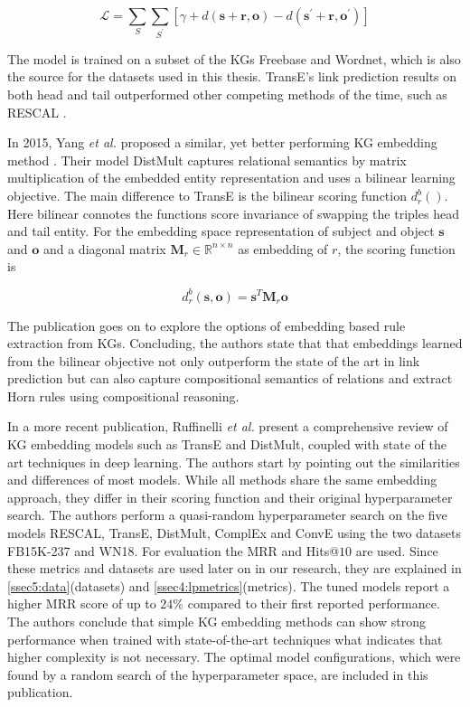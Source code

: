 \begin{equation}
    \mathcal{L}=\sum_{S} \sum_{S^{\prime}} \left[\gamma+d(\boldsymbol{s}+\boldsymbol{r}, \boldsymbol{o})-d\left(\boldsymbol{s}^{\prime}+\boldsymbol{r}, \boldsymbol{o}^{\prime}\right)\right]
\end{equation}

The model is trained on a subset of the KGs Freebase and Wordnet, which is also the source for the datasets used in this thesis. TransE's link prediction results on both head and tail outperformed other competing methods of the time, such as RESCAL \cite{nickel_three-way_nodate}.

In 2015, Yang \textit{et al.} proposed a similar, yet better performing KG embedding method \cite{yang_embedding_2015}. Their model DistMult captures relational semantics by matrix multiplication of the embedded entity representation and uses a bilinear learning objective. The main difference to TransE is the bilinear scoring function $d_{r}^{b}()$. Here bilinear connotes the functions score invariance of swapping the triples head and tail entity. For the embedding space representation of subject and object $\boldsymbol{s}$ and $\boldsymbol{o}$ and a diagonal matrix $\mathbf{M}_{r} \in \mathbb{R}^{n \times n}$ as embedding of $r$, the scoring function is

\begin{equation}
    d_{r}^{b}\left(\boldsymbol{s}, \boldsymbol{o}\right)=\boldsymbol{s}^{T} \mathbf{M}_{r} \boldsymbol{o}
    \label{eq2:distmult}
\end{equation}

The publication goes on to explore the options of embedding based rule extraction from KGs. Concluding, the authors state that that embeddings learned from the bilinear objective not only outperform the state of the art in link prediction but can also capture compositional semantics of relations and extract Horn rules using compositional reasoning.


In a more recent publication, Ruffinelli \textit{et al.} present a comprehensive review of KG embedding models such as TransE and DistMult, coupled with state of the art techniques in deep learning. The authors start by pointing out the similarities and differences of most models. While all methods share the same embedding approach, they differ in their scoring function and their original hyperparameter search. The authors perform a quasi-random hyperparameter search on the five models RESCAL, TransE, DistMult, ComplEx and ConvE using the two datasets FB15K-237 and WN18. For evaluation the MRR and Hits@$10$ are used. Since these metrics and datasets are used later on in our research, they are explained in \ref{ssec5:data}(datasets) and \ref{ssec4:lpmetrics}(metrics). The tuned models report a higher MRR score of up to $24\%$ compared to their first reported performance. The authors conclude that simple KG embedding methods can show strong performance when trained with state-of-the-art techniques what indicates that higher complexity is not necessary. The optimal model configurations, which were found by a random search of the hyperparameter space, are included in this publication. 

